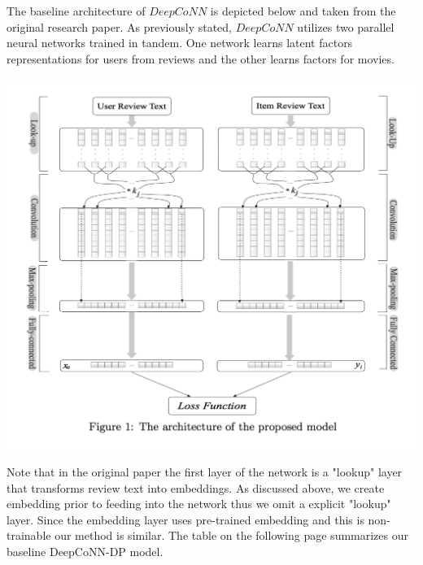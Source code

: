 \documentclass[10pt,twocolumn,letterpaper]{article}
\begin{document}
The baseline architecture of $DeepCoNN$ is depicted below and taken from the original research paper. As previously stated, $DeepCoNN$ utilizes  two parallel neural networks trained in tandem. One network learns latent factors representations for users from reviews and the other learns factors for movies. \\
\ \newline
\includegraphics[scale=0.38]{DeepCoNN}

Note that in the original paper the first layer of the network is a "lookup" layer that transforms review text into embeddings. As discussed above, we create embedding prior to feeding into the network thus we omit a explicit "lookup" layer. Since the embedding layer uses pre-trained embedding and this is non-trainable our method is similar. The table on the following page summarizes our baseline DeepCoNN-DP model.  \\

\end{document}
